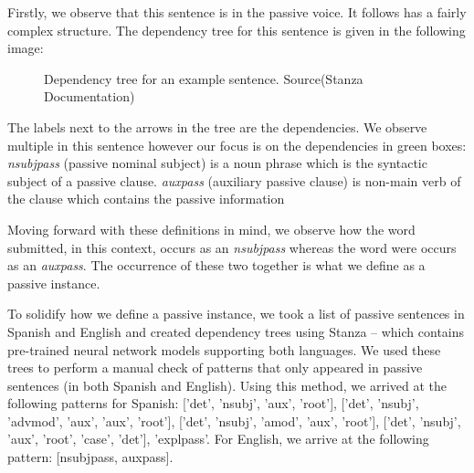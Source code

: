 \documentclass{article}
\begin{document}
{{Firstly, we observe that this sentence is in the passive voice. It follows 
has a fairly complex structure. The dependency tree for this sentence is given in the following image:


\begin{figure}[H]
	\caption{\label{fig:my-label1} Dependency tree for an example sentence. Source(Stanza Documentation)}
\end{figure}

The labels next to the arrows in the tree are the dependencies. We observe multiple in this sentence however our focus is on the dependencies in green boxes: \emph{nsubjpass} (passive nominal subject) is a noun phrase which is the syntactic subject of a passive clause. \emph{auxpass} (auxiliary passive clause) is  non-main verb of the clause which contains the passive information

Moving forward with these definitions in mind, we observe how the word submitted, in this context, occurs as an \emph{nsubjpass} whereas the word were occurs as an \emph{auxpass}. The occurrence of these two together is what we define as a passive instance.

To solidify how we define a passive instance, we took a list of passive sentences in Spanish and English and created dependency trees using Stanza – which contains pre-trained neural network models supporting both languages. We used these trees to perform a manual check of patterns that only appeared in passive sentences (in both Spanish and English). Using this method, we arrived at the following patterns for Spanish: ['det', 'nsubj', 'aux', 'root'], ['det', 'nsubj', 'advmod', 'aux', 'aux', 'root'], ['det', 'nsubj', 'amod', 'aux', 'root'], ['det', 'nsubj', 'aux', 'root', 'case', 'det'], 'explpass'. For English, we arrive at the following pattern: [nsubjpass, auxpass].

}}
\end{document}
